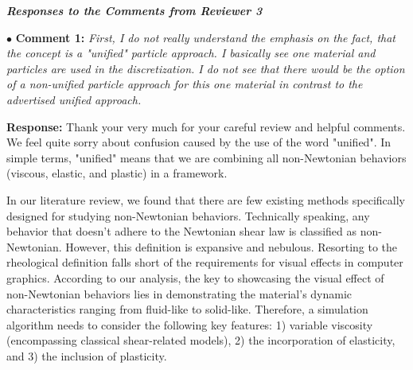 \documentclass[12pt,a4paper]{article}
\begin{document}
\newpage
\vspace{-1.5cm}
\begin{flushleft}
	\textit{\textbf{Responses to the Comments from Reviewer 3}}
\end{flushleft}


\vspace{0.4cm}
\noindent$\bullet$ \enspace \textbf{Comment 1:}
\textit{First, I do not really understand the emphasis on the fact, that the concept is a "unified" particle approach. I basically see one material and particles are used in the discretization. I do not see that there would be the option of a non-unified particle approach for this one material in contrast to the advertised unified approach. }


\vspace{0.2cm}
\textbf{Response:}
Thank your very much for your careful review and helpful comments. We feel quite sorry about confusion caused by the use of the word "unified". In simple terms, "unified" means that we are combining all non-Newtonian behaviors (viscous, elastic, and plastic) in a framework.

In our literature review, we found that there are few existing methods specifically designed for studying non-Newtonian behaviors. Technically speaking, any behavior that doesn't adhere to the Newtonian shear law is classified as non-Newtonian. However, this definition is expansive and nebulous. Resorting to the rheological definition falls short of the requirements for visual effects in computer graphics. According to our analysis, the key to showcasing the visual effect of non-Newtonian behaviors lies in demonstrating the material’s dynamic characteristics ranging from fluid-like to solid-like. Therefore, a simulation algorithm needs to consider the following key features: 1) variable viscosity (encompassing classical shear-related models), 2) the incorporation of elasticity, and 3) the inclusion of plasticity.
\end{document}
